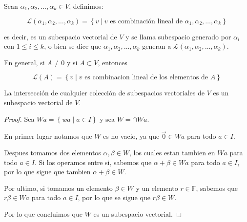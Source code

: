 		\begin{definicion}
			Sean $\alpha_1, \alpha_2, \dots, \alpha_k \in V$, definimos:

			\begin{equation}
				\mathcal{L}(\alpha_1, \alpha_2, \dots, \alpha_k) = \left\{ v \mid v \text{ es combinación lineal de } \alpha_1, \alpha_2, \dots, \alpha_k \right\}
			\end{equation}

			es decir, es un subespacio vectorial de $V$ y se llama subespacio generado por $\alpha_i$ con $1 \leq i \leq k$, o bien se dice que $\alpha_1, \alpha_2, \dots, \alpha_k$ generan a $\mathcal{L}(\alpha_1, \alpha_2, \dots, \alpha_k)$.

			En general, si $A \ne 0$ y si $A \subset V$, entonces

			\begin{equation}
				\mathcal{L}(A) = \left\{ v \mid v \text{ es combinacion lineal de los elementos de } A \right\}
			\end{equation}
		\end{definicion}

		\begin{proposicion}
			La intersección de cualquier colección de subespacios vectoriales de $V$ es un subespacio vectorial de $V$.
		\end{proposicion}

		\begin{proof}
			Sea $W a = \left\{ w a \mid a \in I \right\}$ y sea $W = \cap W a$.

			En primer lugar notamos que $W$ es no vacio, ya que $\vec{0} \in W a$ para todo $a \in I$.

			Despues tomamos dos elementos $\alpha, \beta \in W$, los cuales estan tambien en $W a$ para todo $a \in I$.
			Si los operamos entre si, sabemos que $\alpha + \beta \in W a$ para todo $a \in I$, por lo que sigue que tambien $\alpha + \beta \in W$.

			Por ultimo, si tomamos un elemento $\beta \in W$ y un elemento $r \in \mathbb{F}$, sabemos que $r \beta \in W a$ para todo $a \in I$, por lo que se sigue que $r \beta \in W$.

			Por lo que concluimos que $W$ es un subespacio vectorial.
		\end{proof}

